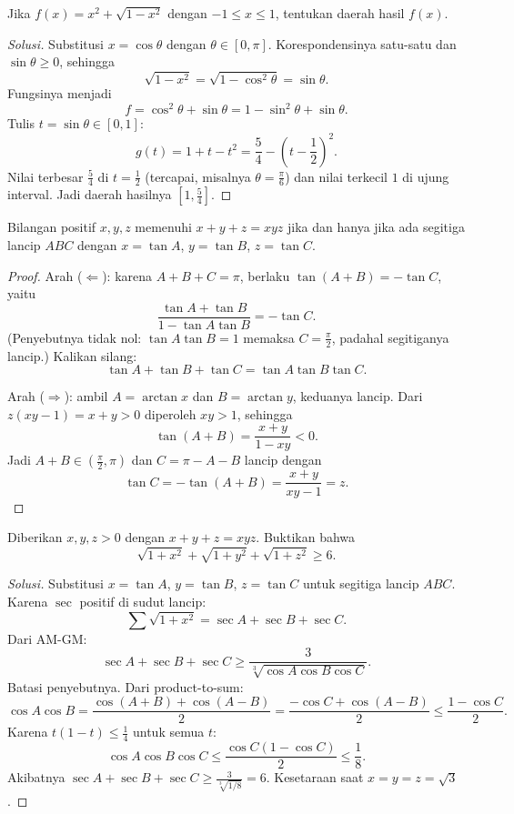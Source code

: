\documentclass[12pt]{scrartcl}
\begin{document}
\begin{example}
Jika $f(x) = x^2 + \sqrt{1-x^2}$ dengan $-1 \le x \le 1$,
tentukan daerah hasil $f(x)$.
\end{example}
\begin{proof}[Solusi]
Substitusi $x = \cos\theta$ dengan $\theta \in [0, \pi]$.
Korespondensinya satu-satu dan $\sin\theta \ge 0$, sehingga
\[ \sqrt{1-x^2} = \sqrt{1-\cos^2\theta} = \sin\theta. \]
Fungsinya menjadi
\[ f = \cos^2\theta + \sin\theta = 1 - \sin^2\theta + \sin\theta. \]
Tulis $t = \sin\theta \in [0, 1]$:
\[ g(t) = 1 + t - t^2 = \frac54 - \left(t-\frac12\right)^2. \]
Nilai terbesar $\frac54$ di $t = \frac12$ (tercapai, misalnya $\theta = \frac{\pi}{6}$)
dan nilai terkecil $1$ di ujung interval. Jadi daerah hasilnya $[1, \frac54]$.
\end{proof}

\begin{theorem}
Bilangan positif $x, y, z$ memenuhi $x + y + z = xyz$ jika dan hanya jika
ada segitiga lancip $ABC$ dengan $x = \tan A$, $y = \tan B$, $z = \tan C$.
\end{theorem}
\begin{proof}
Arah ($\Leftarrow$): karena $A+B+C = \pi$, berlaku $\tan(A+B) = -\tan C$, yaitu
\[ \frac{\tan A + \tan B}{1 - \tan A \tan B} = -\tan C. \]
(Penyebutnya tidak nol: $\tan A \tan B = 1$ memaksa $C = \frac{\pi}{2}$,
padahal segitiganya lancip.) Kalikan silang:
\[ \tan A + \tan B + \tan C = \tan A \tan B \tan C. \]

Arah ($\Rightarrow$): ambil $A = \arctan x$ dan $B = \arctan y$, keduanya lancip.
Dari $z(xy-1) = x + y > 0$ diperoleh $xy > 1$, sehingga
\[ \tan(A+B) = \frac{x+y}{1-xy} < 0. \]
Jadi $A + B \in (\frac{\pi}{2}, \pi)$ dan $C = \pi - A - B$ lancip dengan
\[ \tan C = -\tan(A+B) = \frac{x+y}{xy-1} = z. \]
\end{proof}

\begin{example}
Diberikan $x, y, z > 0$ dengan $x + y + z = xyz$. Buktikan bahwa
\[ \sqrt{1+x^2} + \sqrt{1+y^2} + \sqrt{1+z^2} \ge 6. \]
\end{example}
\begin{proof}[Solusi]
Substitusi $x = \tan A$, $y = \tan B$, $z = \tan C$ untuk segitiga lancip $ABC$.
Karena $\sec$ positif di sudut lancip:
\[ \sum\sqrt{1+x^2} = \sec A + \sec B + \sec C. \]
Dari AM-GM:
\[ \sec A + \sec B + \sec C \ge \frac{3}{\sqrt[3]{\cos A \cos B \cos C}}. \]
Batasi penyebutnya. Dari product-to-sum:
\[ \cos A \cos B = \frac{\cos(A+B) + \cos(A-B)}{2}
= \frac{-\cos C + \cos(A-B)}{2} \le \frac{1-\cos C}{2}. \]
Karena $t(1-t) \le \frac14$ untuk semua $t$:
\[ \cos A \cos B \cos C \le \frac{\cos C(1-\cos C)}{2} \le \frac18. \]
Akibatnya $\sec A + \sec B + \sec C \ge \frac{3}{\sqrt[3]{1/8}} = 6$.
Kesetaraan saat $x = y = z = \sqrt{3}$.
\end{proof}
\end{document}

